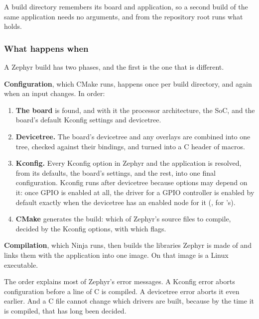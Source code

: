 A build directory remembers its board and application, so a second build of the same application
needs no arguments, and  from the repository root runs what 
holds.

\subsubsection{What happens when}
A Zephyr build has two phases, and the first is the one that is different.

\textbf{Configuration}, which CMake runs, happens once per build directory, and again when an input
changes. In order:

\begin{enumerate}
  \item \textbf{The board} is found, and with it the processor architecture, the SoC, and the board’s
    default Kconfig settings and devicetree.
  \item \textbf{Devicetree.} The board’s devicetree and any overlays are combined into one tree, checked
    against their bindings, and turned into a C header of macros.
  \item \textbf{Kconfig.} Every Kconfig option in Zephyr and the application is resolved, from its defaults,
    the board’s settings,  and the rest, into one final configuration. Kconfig runs after
    devicetree because options may depend on it: once GPIO is enabled at all, the driver for a GPIO
    controller is enabled by default exactly when the devicetree has an enabled node for it
    (, for ’s).
  \item \textbf{CMake} generates the build: which of Zephyr’s source files to compile, decided by the
    Kconfig options, with which flags.
\end{enumerate}

\textbf{Compilation}, which Ninja runs, then builds the libraries Zephyr is made of and links them
with the application into one image. On  that image is a Linux executable.


The order explains most of Zephyr’s error messages. A Kconfig error aborts configuration before a
line of C is compiled. A devicetree error aborts it even earlier. And a C file cannot change which
drivers are built, because by the time it is compiled, that has long been decided.

